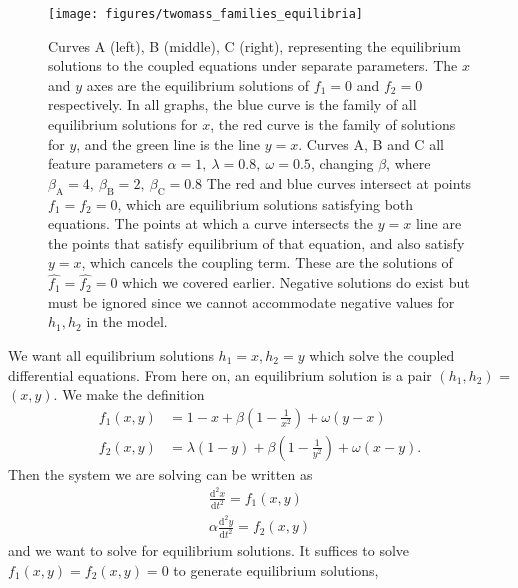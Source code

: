 \begin{figure}[h!]
    \centering
    \texttt{[image: figures/twomass\_families\_equilibria]}
    \caption{
        Curves A (left), B (middle), C (right), representing the equilibrium solutions to the coupled equations under separate parameters.
        The $x$ and $y$ axes are the equilibrium solutions of $f_1 = 0$ and $f_2=0$ respectively. 
        In all graphs, the blue curve is the family of all equilibrium solutions for $x$,
        the red curve is the family of solutions for $y$,
        and the green line is the line $y=x$.
        Curves A, B and C all feature parameters \(\alpha = 1,~\lambda=0.8,~\omega = 0.5\), changing $\beta$,
        where \(\beta_\mathrm{A} = 4,~\beta_\mathrm{B} = 2,~\beta_\mathrm{C} = 0.8\)
        The red and blue curves intersect at points $f_1=f_2=0$,
        which are equilibrium solutions satisfying both equations.
        The points at which a curve intersects the $y=x$ line are the points that satisfy equilibrium of that equation, and also satisfy $y=x$,
        which cancels the coupling term.
        These are the solutions of $\hat{f_1}=\hat{f_2}=0$ which we covered earlier.
        Negative solutions do exist but must be ignored since we cannot accommodate negative values for $h_1, h_2$ in the model.
    }
    \label{fig:twomass_equilibrium_curves}
\end{figure}
We want all equilibrium solutions \(h_1 = x, h_2 = y\) which solve the coupled differential equations.
From here on, an equilibrium solution is a pair \((h_1,h_2)\) = \((x,y)\).
We make the definition
\begin{equation}
    \begin{aligned}
        f_1(x,y) &= 1-x + \beta\left(1 - \frac{1}{x^2}\right) + \omega(y-x) \\
        f_2(x,y) &= \lambda(1-y) + \beta\left(1 - \frac{1}{y^2}\right) + \omega(x-y).
        \label{eqn:twomass_equilibrium_functions}
    \end{aligned}
\end{equation}
Then the system we are solving can be written as
\begin{equation}
    \begin{aligned}
        \frac{\mathrm{d}^2x}{\mathrm{d}t^2} = f_1(x,y) \\
        \alpha\frac{\mathrm{d}^2y}{\mathrm{d}t^2} = f_2(x,y)
        \label{eqn:twomass_slave}  
    \end{aligned}
\end{equation}
and we want to solve for equilibrium solutions. It suffices to solve \(f_1(x,y) = f_2(x,y) = 0\) to generate equilibrium solutions,
